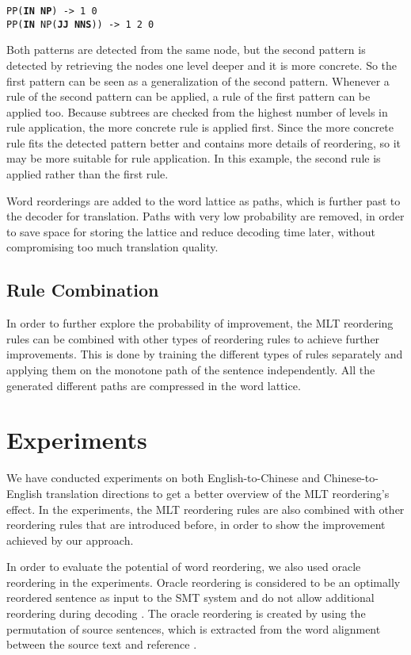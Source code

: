 \documentclass[a4paper]{article}
\begin{document}
\noindent \texttt{PP(\textbf{IN} \textbf{NP}) -> 1 0}\\
\texttt{PP(\textbf{IN} NP(\textbf{JJ} \textbf{NNS})) -> 1 2 0}\bigskip

Both patterns are detected from the same node, but the second pattern is detected by retrieving the nodes one level deeper and it is more concrete. So the first pattern can be seen as a generalization of the second pattern. Whenever a rule of the second pattern can be applied, a rule of the first pattern can be applied too. Because subtrees are checked from the highest number of levels in rule application, the more concrete rule is applied first. Since the more concrete rule fits the detected pattern better and contains more details of reordering, so it may be more suitable for rule application. In this example, the second rule is applied rather than the first rule.

Word reorderings are added to the word lattice as paths, which is further past to the decoder for translation. Paths with very low probability are removed, in order to save space for storing the lattice and reduce decoding time later, without compromising too much translation quality. 

\subsection{Rule Combination}

In order to further explore the probability of improvement, the MLT reordering rules can be combined with other types of reordering rules to achieve further improvements. This is done by training the different types of rules separately and applying them on the monotone path of the sentence independently. All the generated different paths are compressed in the word lattice.

\section{Experiments}
\label{ex}

We have conducted experiments on both English-to-Chinese and Chinese-to-English translation directions to get a better overview of the MLT reordering's effect. In the experiments, the MLT reordering rules are also combined with other reordering rules that are introduced before, in order to show the improvement achieved by our approach.

In order to evaluate the potential of word reordering, we also used oracle reordering in the experiments. Oracle reordering is considered to be an optimally reordered sentence as input to the SMT system and do not allow additional reordering during decoding \cite{combine}. The oracle reordering is created by using the permutation of source sentences, which is extracted from the word alignment between the source text and reference \cite{birch2}.
\end{document}
